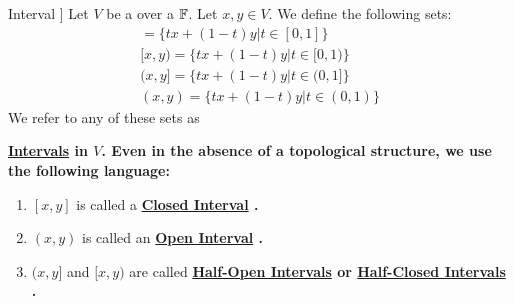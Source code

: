 \label{def:Interval}
\newcommand{\Interval}[0]{
    \bf \hyperref[def:Interval]{Interval} \rm
}
\newcommand{\Intervals}[0]{
    \bf \hyperref[def:Interval]{Intervals} \rm
}
\newcommand{\ClosedInterval}[0]{
    \bf \hyperref[def:Interval]{Closed Interval} \rm
}
\newcommand{\ClosedIntervals}[0]{
    \bf \hyperref[def:Interval]{Closed Intervals} \rm
}
\newcommand{\OpenInterval}[0]{
    \bf \hyperref[def:Interval]{Open Interval} \rm
}
\newcommand{\OpenIntervals}[0]{
    \bf \hyperref[def:Interval]{Open Intervals} \rm
}
\newcommand{\HalfClosedInterval}[0]{
    \bf \hyperref[def:Interval]{Half-Closed Interval} \rm
}
\newcommand{\HalfClosedIntervals}[0]{
    \bf \hyperref[def:Interval]{Half-Closed Intervals} \rm
}
\newcommand{\HalfOpenInterval}[0]{
    \bf \hyperref[def:Interval]{Half-Open Interval} \rm
}
\newcommand{\HalfOpenIntervals}[0]{
    \bf \hyperref[def:Interval]{Half-Open Intervals} \rm
}
\begin{df}[\Interval]
    Let $V$ be a 
    \VectorSpace 
    over a 
    \Field
    $\mathbb{F}$. 
    Let $x,y \in V$. 
    We define the following sets:
    \begin{align*} 
        [x,y] = \{tx+(1-t)y | t \in [0,1] \} \\
        [x,y) = \{tx+(1-t)y | t \in [0,1) \} \\
        (x,y] = \{tx+(1-t)y | t \in (0,1] \} \\
        (x,y) = \{tx+(1-t)y | t \in (0,1) \}
    \end{align*}
    We refer to any of these sets as 
    \Intervals in $V$.
    Even in the absence of a topological structure, 
    we use the following language:
    \begin{enumerate}
        \item $[x,y]$ is called a \ClosedInterval.
        \item $(x,y)$ is called an \OpenInterval.
        \item $(x,y]$ and $[x,y)$ are called \HalfOpenIntervals or \HalfClosedIntervals.
    \end{enumerate}
\end{df}
